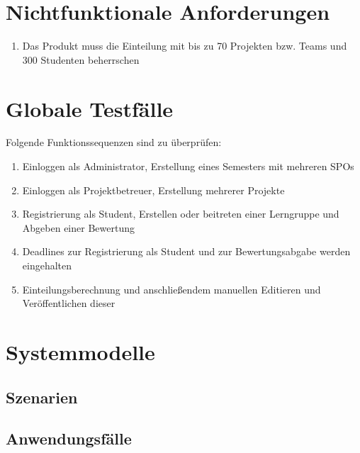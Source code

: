 \documentclass[parskip=full]{scrartcl}
\newcommand{\swtLabel}[1]{\textbf{\textbackslash #1\arabic*0\textbackslash}}
\begin{document}
\section{Nichtfunktionale Anforderungen}
\begin{enumerate}[label=\swtLabel{NA}]
  \item Das Produkt muss die Einteilung mit bis zu 70 Projekten bzw. Teams und 300 Studenten beherrschen
\end{enumerate}
\section{Globale Testfälle}
Folgende Funktionssequenzen sind zu überprüfen:
\begin{enumerate} [label=\swtLabel{T}]
  \item Einloggen als Administrator, Erstellung eines Semesters mit mehreren SPOs
  \item Einloggen als Projektbetreuer, Erstellung mehrerer Projekte
  \item Registrierung als Student, Erstellen oder beitreten einer Lerngruppe und Abgeben einer Bewertung
  \item Deadlines zur Registrierung als Student und zur Bewertungsabgabe werden eingehalten
  \item Einteilungsberechnung und anschließendem manuellen Editieren und Veröffentlichen dieser
\end{enumerate}
\section{Systemmodelle}

\subsection{Szenarien}

\subsection{Anwendungsfälle}
\end{document}

